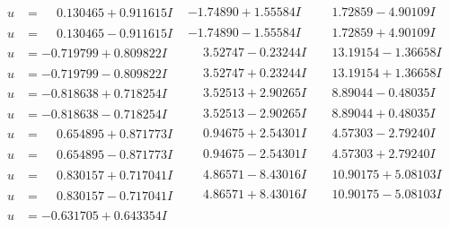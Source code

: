 \documentclass[1p]{elsarticle_modified}
\theoremstyle{definition}
\begin{document}
$$\begin{array}{c|c|c}
\begin{aligned}
u &= \phantom{-}0.130465 + 0.911615 I\end{aligned}
 & -1.74890 + 1.55584 I & \phantom{-}1.72859 - 4.90109 I \\ \hline\begin{aligned}
u &= \phantom{-}0.130465 - 0.911615 I\end{aligned}
 & -1.74890 - 1.55584 I & \phantom{-}1.72859 + 4.90109 I \\ \hline\begin{aligned}
u &= -0.719799 + 0.809822 I\end{aligned}
 & \phantom{-}3.52747 - 0.23244 I & \phantom{-}13.19154 - 1.36658 I \\ \hline\begin{aligned}
u &= -0.719799 - 0.809822 I\end{aligned}
 & \phantom{-}3.52747 + 0.23244 I & \phantom{-}13.19154 + 1.36658 I \\ \hline\begin{aligned}
u &= -0.818638 + 0.718254 I\end{aligned}
 & \phantom{-}3.52513 + 2.90265 I & \phantom{-}8.89044 - 0.48035 I \\ \hline\begin{aligned}
u &= -0.818638 - 0.718254 I\end{aligned}
 & \phantom{-}3.52513 - 2.90265 I & \phantom{-}8.89044 + 0.48035 I \\ \hline\begin{aligned}
u &= \phantom{-}0.654895 + 0.871773 I\end{aligned}
 & \phantom{-}0.94675 + 2.54301 I & \phantom{-}4.57303 - 2.79240 I \\ \hline\begin{aligned}
u &= \phantom{-}0.654895 - 0.871773 I\end{aligned}
 & \phantom{-}0.94675 - 2.54301 I & \phantom{-}4.57303 + 2.79240 I \\ \hline\begin{aligned}
u &= \phantom{-}0.830157 + 0.717041 I\end{aligned}
 & \phantom{-}4.86571 - 8.43016 I & \phantom{-}10.90175 + 5.08103 I \\ \hline\begin{aligned}
u &= \phantom{-}0.830157 - 0.717041 I\end{aligned}
 & \phantom{-}4.86571 + 8.43016 I & \phantom{-}10.90175 - 5.08103 I \\ \hline\begin{aligned}
u &= -0.631705 + 0.643354 I\end{aligned}

\end{array}$$
\end{document}

